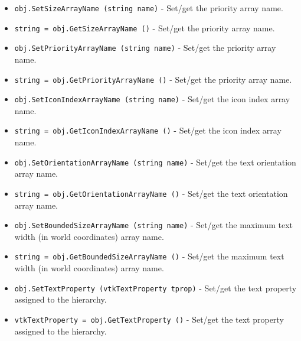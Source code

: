 \begin{itemize}
\item  \verb|obj.SetSizeArrayName (string name)| -  Set/get the priority array name.

\item  \verb|string = obj.GetSizeArrayName ()| -  Set/get the priority array name.

\item  \verb|obj.SetPriorityArrayName (string name)| -  Set/get the priority array name.

\item  \verb|string = obj.GetPriorityArrayName ()| -  Set/get the priority array name.

\item  \verb|obj.SetIconIndexArrayName (string name)| -  Set/get the icon index array name.

\item  \verb|string = obj.GetIconIndexArrayName ()| -  Set/get the icon index array name.

\item  \verb|obj.SetOrientationArrayName (string name)| -  Set/get the text orientation array name.

\item  \verb|string = obj.GetOrientationArrayName ()| -  Set/get the text orientation array name.

\item  \verb|obj.SetBoundedSizeArrayName (string name)| -  Set/get the maximum text width (in world coordinates) array name.

\item  \verb|string = obj.GetBoundedSizeArrayName ()| -  Set/get the maximum text width (in world coordinates) array name.

\item  \verb|obj.SetTextProperty (vtkTextProperty tprop)| -  Set/get the text property assigned to the hierarchy.

\item  \verb|vtkTextProperty = obj.GetTextProperty ()| -  Set/get the text property assigned to the hierarchy.

\end{itemize}
